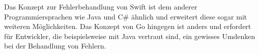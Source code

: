 Das Konzept zur Fehlerbehandlung von Swift ist dem anderer Programmiersprachen wie Java und C\# ähnlich und erweitert diese sogar mit weiteren Möglichkeiten.
Das Konzept von Go hingegen ist anders und erfordert für Entwickler, die beispielsweise mit Java vertraut sind, ein gewisses Umdenken bei der Behandlung von Fehlern. 
